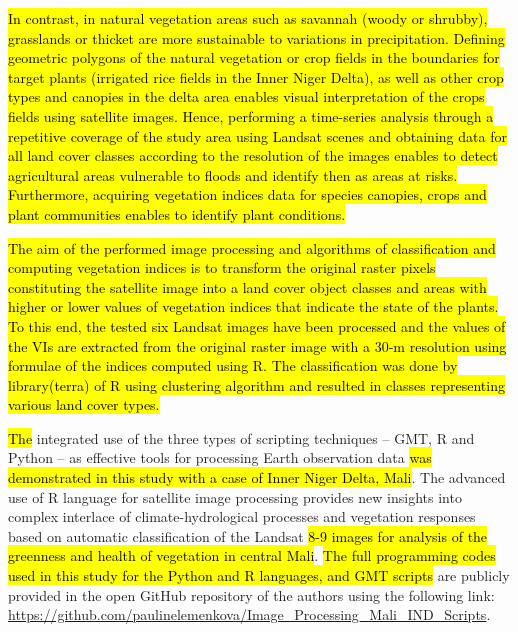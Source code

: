 \documentclass[12pt,a4paper,oneside]{article}
\def \newpar{\vspace{6pt}}
\begin{document}
\newpar \hl{In contrast, in natural vegetation areas such as savannah (woody or shrubby), grasslands or thicket are more sustainable to variations in precipitation. Defining geometric polygons of the natural vegetation or crop fields in the boundaries for target plants (irrigated rice fields in the Inner Niger Delta), as well as other crop types and canopies in the delta area enables visual interpretation of the crops fields using satellite images. Hence, performing a time-series analysis through a repetitive coverage of the study area using Landsat scenes and obtaining data for all land cover classes according to the resolution of the images enables to detect agricultural areas vulnerable to floods and identify then as areas at risks. Furthermore, acquiring vegetation indices data for species canopies, crops and plant communities enables to identify plant conditions. }

\newpar \hl{The aim of the performed image processing and algorithms of classification and computing vegetation indices is to transform the original raster pixels constituting the satellite image into a land cover object classes and areas with higher or lower values of vegetation indices that indicate the state of the plants. To this end, the tested six Landsat images have been processed and the values of the VIs are extracted from the original raster image with a 30-m resolution using formulae of the indices computed using R. The classification was done by library(terra) of R using clustering algorithm and resulted in classes representing various land cover types.} 

\newpar \hl{The} integrated use of the three types of scripting techniques -- GMT, R and Python -- as effective tools for processing Earth observation data \hl{was demonstrated in this study with a case of Inner Niger Delta, Mali}. The advanced use of R language for satellite image processing provides new insights into complex interlace of climate-hydrological processes and vegetation responses based on automatic classification of the Landsat \hl{8-9 images for analysis of the greenness and health of vegetation in central Mali}. \hl{The full programming codes used in this study for the Python and R languages, and GMT scripts} are publicly provided in the open GitHub repository of the authors using the following link: \href{https://github.com/paulinelemenkova/Image_Processing_Mali_IND_Scripts}{https://github.com/paulinelemenkova/Image\_Processing\_Mali\_IND\_Scripts}. 
\end{document}
